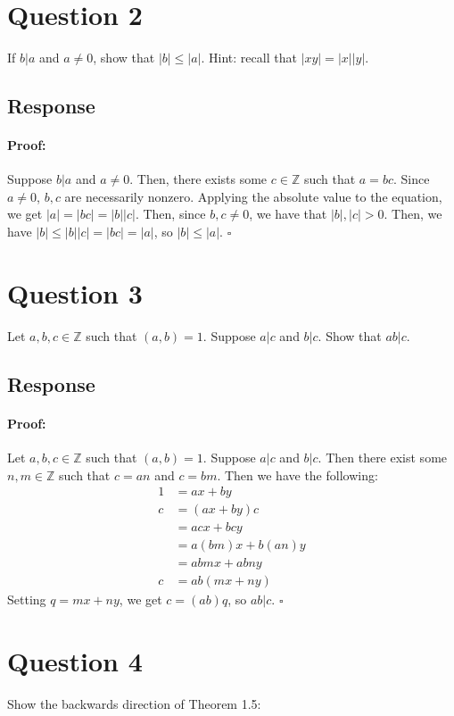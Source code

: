 \documentclass [12pt] {article}
\newcommand{\Z}{\mathbb{Z}}
\newenvironment{proof}{\paragraph{Proof:}}{\hfill$\square$}
\begin{document}
\section*{Question 2}
If $b | a$ and $a \neq 0$, show that $|b| \leq |a|$.  Hint: recall that $|xy| = |x||y|$.

\subsection*{Response}
\begin{proof}
    Suppose $b | a$ and $a \neq 0$. Then, there exists some $c \in \Z$ such that $a = bc$. Since
    $a \neq 0$, $b, c$ are necessarily nonzero. Applying the absolute value to the equation, we get
    $|a| = |bc| = |b||c|$. Then, since $b, c \neq 0$, we have that $|b|, |c| > 0$. Then, we have
    $|b| \leq |b||c| = |bc| = |a|$, so $|b| \leq |a|$.
\end{proof}
\newpage

\section*{Question 3}
Let $a,b,c\in \Z$ such that $(a,b)=1$. Suppose $a|c$ and $b|c$. Show that $ab|c$. 

\subsection*{Response}
\begin{proof}
    Let $a, b, c \in \Z$ such that $(a, b) = 1$. Suppose $a | c$ and $b | c$. Then there exist some
    $n, m \in \Z$ such that $c = an$ and $c = bm$. Then we have the following:
    \begin{align*}
        1 &= ax + by \\
        c &= (ax + by)c \\
          &= acx + bcy \\
          &= a(bm)x + b(an)y \\
          &= abmx + abny \\
        c &= ab(mx + ny)
    \end{align*}
    Setting $q = mx + ny$, we get $c = (ab)q$, so $ab | c$.
\end{proof}
\newpage

\section*{Question 4}
Show the backwards direction of Theorem 1.5:
\end{document}
